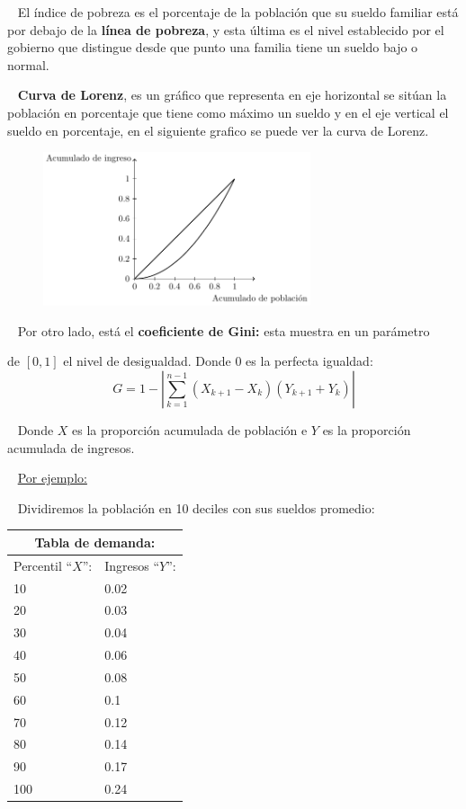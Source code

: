 \documentclass[
  letterpaper,
  DIV=11,
  numbers=noendperiod]{scrreport}
\begin{document}
~ El índice de pobreza es el porcentaje de la población que su sueldo
familiar está por debajo de la \textbf{línea de pobreza}, y esta última
es el nivel establecido por el gobierno que distingue desde que punto
una familia tiene un sueldo bajo o normal.

~ \textbf{Curva de Lorenz}, es un gráfico que representa en eje
horizontal se sitúan la población en porcentaje que tiene como máximo un
sueldo y en el eje vertical el sueldo en porcentaje, en el siguiente
grafico se puede ver la curva de Lorenz.

\begin{figure}

{\centering \includegraphics[width=0.7\textwidth,height=\textheight]{4sistimpo_files/figure-pdf/unnamed-chunk-5-1.pdf}

}

\end{figure}

~ Por otro lado, está el \textbf{coeficiente de Gini:} esta muestra en
un parámetro

de \([0,1]\) el nivel de desigualdad. Donde 0 es la perfecta igualdad:
\[
G=1-\left|\sum_{k=1}^{n-1}\left(X_{k+1}-X_k\right)\left(Y_{k+1}+Y_k\right)\right| 
\]

~ Donde \(X\) es la proporción acumulada de población e \(Y\) es la
proporción acumulada de ingresos.

~ \ul{Por ejemplo:}

~ Dividiremos la población en 10 deciles con sus sueldos promedio:

\begin{table}[H]
    \centering
    \begin{tabular}{|p{25mm}|p{25mm}|}
        \multicolumn{2}{c}{Tabla de demanda:} \\
        \hline
        Percentil “$X$”: & Ingresos “$Y$”: \\ \hline
        10 & 0.02 \\ \hline
        20 & 0.03 \\ \hline
        30 & 0.04 \\ \hline
        40 & 0.06 \\ \hline
        50 & 0.08 \\ \hline
        60 & 0.1 \\ \hline
        70 & 0.12 \\ \hline
        80 & 0.14 \\ \hline
        90 & 0.17 \\ \hline
        100 & 0.24 \\ \hline
        \end{tabular}
\end{table}
\end{document}

